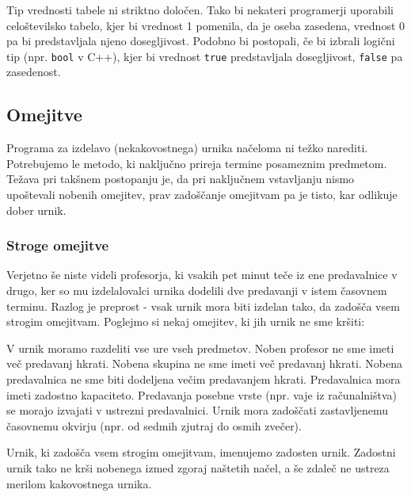 \documentclass[a4paper,10pt]{article}
\begin{document}
Tip vrednosti tabele ni striktno določen. Tako bi nekateri programerji uporabili
celoštevilsko tabelo, kjer bi vrednost 1 pomenila, da je oseba zasedena, vrednost 0
pa bi predstavljala njeno dosegljivost. Podobno bi postopali, če bi izbrali logični
tip (npr. \texttt{bool} v C++), kjer bi vrednost \texttt{true} predstavljala
dosegljivost, \texttt{false} pa zasedenost.

\subsection{Omejitve}

Programa za izdelavo (nekakovostnega) urnika načeloma ni težko narediti. Potrebujemo
le metodo, ki naključno prireja termine posameznim predmetom. Težava pri takšnem postopanju
je, da pri naključnem vstavljanju nismo upoštevali nobenih omejitev, prav zadoščanje omejitvam
pa je tisto, kar odlikuje dober urnik.

\subsubsection{Stroge omejitve}

Verjetno še niste videli profesorja, ki vsakih pet minut teče iz ene predavalnice v drugo,
ker so mu izdelalovalci urnika dodelili dve predavanji v istem časovnem terminu. Razlog
je preprost - vsak urnik mora biti izdelan tako, da zadošča vsem strogim omejitvam.
Poglejmo si nekaj omejitev, ki jih urnik ne sme kršiti:

   V urnik moramo razdeliti vse ure vseh predmetov.
   Noben profesor ne sme imeti več predavanj hkrati.
   Nobena skupina ne sme imeti več predavanj hkrati.
   Nobena predavalnica ne sme biti dodeljena večim predavanjem hkrati.
   Predavalnica mora imeti zadostno kapaciteto.
   Predavanja posebne vrste (npr. vaje iz računalništva) se morajo izvajati v ustrezni predavalnici.
   Urnik mora zadoščati zastavljenemu časovnemu okvirju (npr. od sedmih zjutraj do osmih zvečer).

Urnik, ki zadošča vsem strogim omejitvam, imenujemo zadosten urnik. Zadostni urnik tako ne
krši nobenega izmed zgoraj naštetih načel, a še zdaleč ne ustreza merilom kakovostnega urnika.
\end{document}
